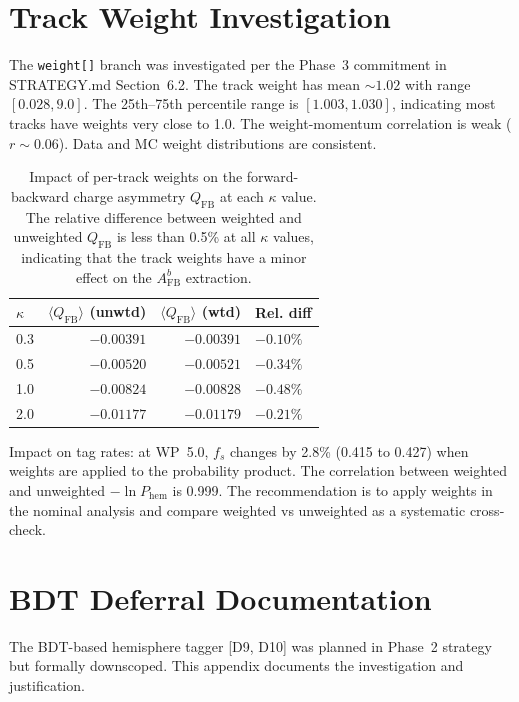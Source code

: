 \documentclass[11pt,a4paper]{article}
\begin{document}
\section{Track Weight Investigation}
\label{app:track_weights}

The \texttt{weight[]} branch was investigated per the Phase~3 commitment in
STRATEGY.md Section~6.2. The track weight has mean $\sim 1.02$ with range
$[0.028, 9.0]$. The 25th--75th percentile range is $[1.003, 1.030]$, indicating
most tracks have weights very close to 1.0. The weight-momentum correlation is
weak ($r \sim 0.06$). Data and MC weight distributions are consistent.

\begin{table}[htbp]
\centering
\caption{Impact of per-track weights on the forward-backward charge asymmetry
$Q_\mathrm{FB}$ at each $\kappa$ value. The relative difference between weighted
and unweighted $Q_\mathrm{FB}$ is less than 0.5\% at all $\kappa$ values, indicating
that the track weights have a minor effect on the $A_\mathrm{FB}^b$ extraction.}
\label{tab:weight_impact}
\begin{tabular}{lrrl}
\toprule
$\kappa$ & $\langle Q_\mathrm{FB} \rangle$ (unwtd) & $\langle Q_\mathrm{FB} \rangle$ (wtd) & Rel. diff \\
\midrule
0.3 & $-0.00391$ & $-0.00391$ & $-0.10\%$ \\
0.5 & $-0.00520$ & $-0.00521$ & $-0.34\%$ \\
1.0 & $-0.00824$ & $-0.00828$ & $-0.48\%$ \\
2.0 & $-0.01177$ & $-0.01179$ & $-0.21\%$ \\
\bottomrule
\end{tabular}
\end{table}

Impact on tag rates: at WP~5.0, $f_s$ changes by 2.8\% (0.415 to 0.427) when weights
are applied to the probability product. The correlation between weighted and unweighted
$-\ln P_\mathrm{hem}$ is 0.999. The recommendation is to apply weights in the nominal
analysis and compare weighted vs unweighted as a systematic cross-check.

\section{BDT Deferral Documentation}
\label{app:bdt_deferral}

The BDT-based hemisphere tagger [D9, D10] was planned in Phase~2 strategy but formally
downscoped. This appendix documents the investigation and justification.
\end{document}
